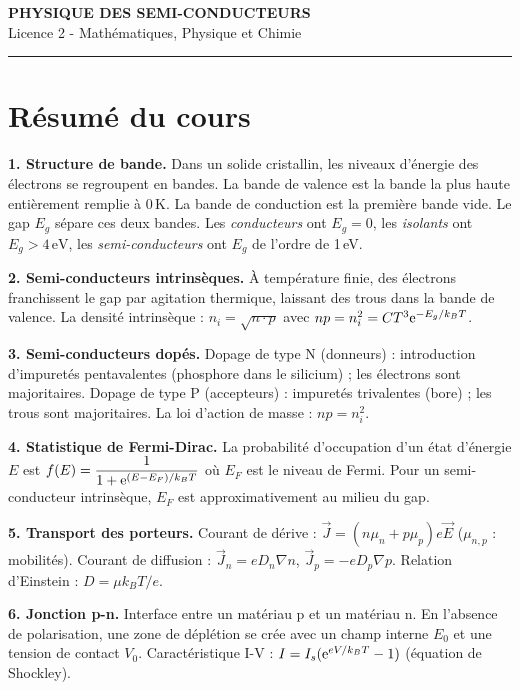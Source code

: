 \documentclass[12pt,a4paper]{article}
\begin{document}
\fi

\begin{center}
  {\LARGE\bfseries PHYSIQUE DES SEMI-CONDUCTEURS}\\[0.3cm]
  {\normalsize Licence 2 - Mathématiques, Physique et Chimie}\\[0.1cm]
  \rule{0.7\textwidth}{0.8pt}
\end{center}

\section*{Résumé du cours}

\begin{boiteresume}

\textbf{1. Structure de bande.} Dans un solide cristallin, les niveaux d'énergie des électrons se regroupent en bandes. La bande de valence est la bande la plus haute entièrement remplie à 0\,K. La bande de conduction est la première bande vide. Le gap $E_g$ sépare ces deux bandes. Les \textit{conducteurs} ont $E_g=0$, les \textit{isolants} ont $E_g>4\,\text{eV}$, les \textit{semi-conducteurs} ont $E_g$ de l'ordre de 1\,eV.

\textbf{2. Semi-conducteurs intrinsèques.} À température finie, des électrons franchissent le gap par agitation thermique, laissant des trous dans la bande de valence. La densité intrinsèque : $n_i = \sqrt{n\cdot p}$ avec $np = n_i^2 = C T^3\mathrm{e}^{-E_g/k_BT}$.

\textbf{3. Semi-conducteurs dopés.} Dopage de type N (donneurs) : introduction d'impuretés pentavalentes (phosphore dans le silicium) ; les électrons sont majoritaires. Dopage de type P (accepteurs) : impuretés trivalentes (bore) ; les trous sont majoritaires. La loi d'action de masse : $np = n_i^2$.

\textbf{4. Statistique de Fermi-Dirac.} La probabilité d'occupation d'un état d'énergie $E$ est $f(E) = \dfrac{1}{1+\mathrm{e}^{(E-E_F)/k_BT}}$ où $E_F$ est le niveau de Fermi. Pour un semi-conducteur intrinsèque, $E_F$ est approximativement au milieu du gap.

\textbf{5. Transport des porteurs.} Courant de dérive : $\vec{J} = (n\mu_n + p\mu_p)e\vec{E}$ ($\mu_{n,p}$ : mobilités). Courant de diffusion : $\vec{J}_n = eD_n\nabla n$, $\vec{J}_p = -eD_p\nabla p$. Relation d'Einstein : $D = \mu k_BT/e$.

\textbf{6. Jonction p-n.} Interface entre un matériau p et un matériau n. En l'absence de polarisation, une zone de déplétion se crée avec un champ interne $E_0$ et une tension de contact $V_0$. Caractéristique I-V : $I = I_s(\mathrm{e}^{eV/k_BT}-1)$ (équation de Shockley).

\end{boiteresume}
\end{document}

